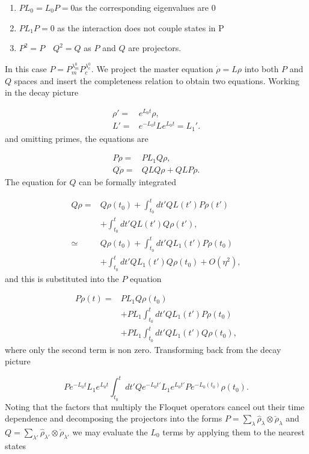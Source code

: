 \documentclass[reprint, amsmath,amssymb, aps,pra]{revtex4-1}
\begin{document}
\begin{enumerate}

\item $ PL_{0} = L_{0}P = 0 $\qquad as the corresponding eigenvalues are 0

\item $PL_{1}P=0$ \qquad as the interaction does not couple states in P

\item $P^2 = P \quad Q^2 = Q$ \qquad as $P$ and $Q$ are projectors.
\end{enumerate} In this case $P=P_m^{\lambda_m^0}P_c^{\lambda_c^0}$. We project the master equation $\dot{\rho}=L\rho$ into both $P$ and $Q$ spaces and insert the completeness relation to obtain two equations. Working in the decay picture

\begin{align*}
 \rho' =& e^{L_0t}\rho,\\
 L' =& e^{-L_0t}Le^{L_0t} = L_1'.
\end{align*} and omitting primes, the equations are

\begin{align*}
P\dot{\rho} =& PL_1Q\rho, \\
Q\dot{\rho} =& QLQ\rho + QLP\rho.
\end{align*} The equation for $Q$ can be formally integrated \cite{TesisMaestria}

\begin{align*}
Q\rho =& Q\rho(t_0) + \int_{t_0}^{t}dt' QL(t')P\rho(t')\\
       &+\int_{t_0}^{t}dt'QL(t')Q\rho(t'),\\
\simeq & Q\rho(t_0) + \int_{t_0}^{t}dt' QL_1(t')P\rho(t_0)\\
       &+\int_{t_0}^{t}dt'QL_1(t')Q\rho(t_0)+O(\eta^2),
\end{align*} and this is substituted into the $P$ equation

\begin{align}
P\dot{\rho}(t) =& PL_1Q\rho(t_0)\\ 
 &+ PL_1\int_{t_0}^{t}dt' QL_1(t')P\rho(t_0)\nonumber \\
 &+ PL_1\int_{t_0}^{t}dt'QL_1(t')Q\rho(t_0) \nonumber,
\end{align} where only the second term is non zero. Transforming back from the decay picture

\begin{equation}
P e^{-L_0 t}L_1e^{L_0 t}\int_{t_0}^{t}dt'Qe^{-L_0 t'}L_1e^{L_0 t'}Pe^{-L_0(t_0)}\rho(t_0).
\end{equation} Noting that the factors that multiply the Floquet operators cancel out their time dependence and decomposing the projectors into the forms $P=\sum_\lambda \hat{\rho}_\lambda \otimes \check{\rho}_\lambda$ and $Q=\sum_{\lambda'} \hat{\rho}_{\lambda'} \otimes \check{\rho}_{\lambda'}$ we may evaluate the $L_0$ terms by applying them to the nearest states
\end{document}
